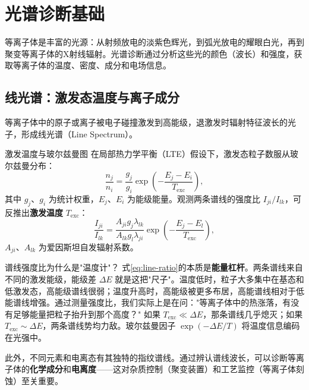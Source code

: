 \section{光谱诊断基础}
\label{sec:12.5}

等离子体是丰富的光源：从射频放电的淡紫色辉光，到弧光放电的耀眼白光，再到聚变等离子体的X射线辐射。光谱诊断通过分析这些光的颜色（波长）和强度，获取等离子体的温度、密度、成分和电场信息。

\subsection{线光谱：激发态温度与离子成分}

等离子体中的原子或离子被电子碰撞激发到高能级，退激发时辐射特征波长的光子，形成线光谱（Line Spectrum）。

\begin{definition}{激发温度与玻尔兹曼图}{}{}
在局部热力学平衡（LTE）假设下，激发态粒子数服从玻尔兹曼分布：
\begin{equation}
\frac{n_j}{n_i} = \frac{g_j}{g_i}\exp\!\left(-\frac{E_j - E_i}{T_{\mathrm{exc}}}\right),
\label{eq:boltzmann-excitation}
\end{equation}
其中 $g_j$、$g_i$ 为统计权重，$E_j$、$E_i$ 为能级能量。观测两条谱线的强度比 $I_{ji}/I_{lk}$，可反推出\textbf{激发温度} $T_{\mathrm{exc}}$：
\begin{equation}
\frac{I_{ji}}{I_{lk}} = \frac{A_{ji} g_j \lambda_{lk}}{A_{lk} g_l \lambda_{ji}} \exp\!\left(-\frac{E_j - E_l}{T_{\mathrm{exc}}}\right),
\label{eq:line-ratio}
\end{equation}
$A_{ji}$、$A_{lk}$ 为爱因斯坦自发辐射系数。
\end{definition}

\begin{insight}{谱线强度比为什么是"温度计"？}{}{}
式\eqref{eq:line-ratio}的本质是\textbf{能量杠杆}。两条谱线来自不同的激发能级，能级差 $\Delta E$ 就是这把"尺子"。温度低时，粒子大多集中在基态和低激发态，高能级谱线很弱；温度升高时，高能级被更多布居，高能谱线相对于低能谱线增强。通过测量强度比，我们实际上是在问："等离子体中的热涨落，有没有足够能量把粒子抬升到那个高度？" 如果 $T_{\mathrm{exc}} \ll \Delta E$，那条谱线几乎熄灭；如果 $T_{\mathrm{exc}} \sim \Delta E$，两条谱线势均力敌。玻尔兹曼因子 $\exp(-\Delta E/T)$ 将温度信息编码在光强中。
\end{insight}

此外，不同元素和电离态有其独特的指纹谱线。通过辨认谱线波长，可以诊断等离子体的\textbf{化学成分}和\textbf{电离度}——这对杂质控制（聚变装置）和工艺监控（等离子体刻蚀）至关重要。

